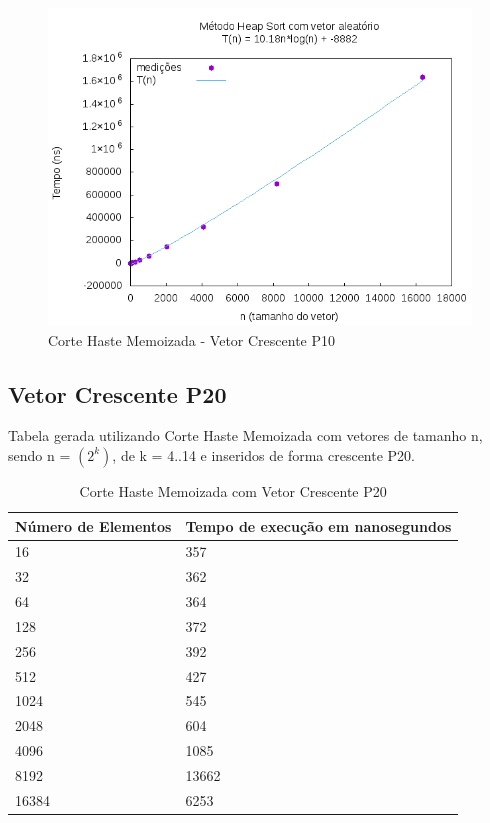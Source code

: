 \documentclass[12pt,a4paper,twoside]{report}
\begin{document}
\begin{figure}[H]
    \centering
    \includegraphics[width=0.7\linewidth]{graficos/HeapSort/vIntAleatorio/vIntAleatorio.png}
  \caption{Corte Haste Memoizada - Vetor Crescente P10}
\end{figure}





\subsection{Vetor Crescente P20}
Tabela gerada utilizando Corte Haste Memoizada com vetores de tamanho n, sendo n = $(2^k)$, de k = 4..14 e inseridos de forma crescente P20.
\begin{table}[H]
\centering
\caption{Corte Haste Memoizada com Vetor Crescente P20}
\label{my-label}
\begin{tabular}{|l|l|}
\hline
\multicolumn{1}{|c|}{\textbf{Número de Elementos}} & \multicolumn{1}{c|}{\textbf{Tempo de execução em nanosegundos}} \\ \hline
16 & 357 \\ \hline
32 & 362 \\ \hline
64 & 364 \\ \hline
128 & 372 \\ \hline
256 & 392 \\ \hline
512 & 427 \\ \hline
1024 & 545 \\ \hline
2048 & 604 \\ \hline
4096 & 1085 \\ \hline
8192 & 13662 \\ \hline
16384 & 6253 \\ \hline
\end{tabular}
\end{table}
\end{document}
